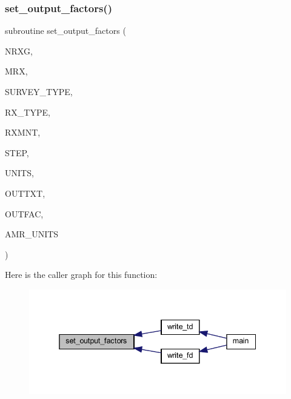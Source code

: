 \mbox{\label{Marco_8f90_a9bd15661efc3d31965bbbb37b06cb37f}} 
\subsubsection{\texorpdfstring{set\+\_\+output\+\_\+factors()}{set\_output\_factors()}}
{\footnotesize\ttfamily subroutine set\+\_\+output\+\_\+factors (\begin{DoxyParamCaption}\item[{integer}]{N\+R\+XG,  }\item[{integer}]{M\+RX,  }\item[{integer}]{S\+U\+R\+V\+E\+Y\+\_\+\+T\+Y\+PE,  }\item[{integer, dimension(nrxg)}]{R\+X\+\_\+\+T\+Y\+PE,  }\item[{real, dimension(mrx,nrxg)}]{R\+X\+M\+NT,  }\item[{integer}]{S\+T\+EP,  }\item[{integer, dimension(nrxg)}]{U\+N\+I\+TS,  }\item[{character(len=16), dimension(nrxg)}]{O\+U\+T\+T\+XT,  }\item[{real, dimension(mrx,nrxg)}]{O\+U\+T\+F\+AC,  }\item[{character (len = 06), dimension(nrxg)}]{A\+M\+R\+\_\+\+U\+N\+I\+TS }\end{DoxyParamCaption})}

Here is the caller graph for this function\+:
\nopagebreak
\begin{figure}[H]
\begin{center}
\leavevmode
\includegraphics[width=338pt]{Marco_8f90_a9bd15661efc3d31965bbbb37b06cb37f_icgraph}
\end{center}
\end{figure}
\mbox{\label{Marco_8f90_aa3ebed79e45d9533c2e2d7c6e1cdc01a}} 
